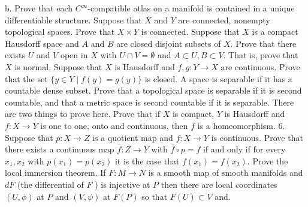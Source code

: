 \documentclass[10pt]{article}
\begin{document}
b. Prove that each $C^{\infty}$-compatible atlas on a manifold is contained in a unique differentiable structure.
\newpage
   Suppose that $X$ and $Y$ are connected, nonempty topological spaces. Prove that $X \times Y$ is connected.
\newpage
   Suppose that $X$ is a compact Hausdorff space and $A$ and $B$ are closed disjoint subsets of $X$. Prove that there exists $U$ and $V$ open in $X$ with $U \cap V=\emptyset$ and $A \subset U, B \subset V$. That is, prove that $X$ is normal.
\newpage
   Suppose that $X$ is Hausdorff and $f, g: Y \rightarrow X$ are continuous. Prove that the set $\{y \in Y \mid f(y)=g(y)\}$ is closed.
\newpage
   A space is separable if it has a countable dense subset. Prove that a topological space is separable if it is second countable, and that a metric space is second countable if it is separable. There are two things to prove here.
\newpage
   Prove that if $X$ is compact, $Y$ is Hausdorff and $f: X \rightarrow Y$ is one to one, onto and continuous, then $f$ is a homeomorphism. 6. Suppose that $p: X \rightarrow Z$ is a quotient map and $f: X \rightarrow Y$ is continuous. Prove that there exists a continuous map $\bar{f}: Z \rightarrow Y$ with $\bar{f} \circ p=f$ if and only if for every $x_{1}, x_{2}$ with $p\left(x_{1}\right)=p\left(x_{2}\right)$ it is the case that $f\left(x_{1}\right)=f\left(x_{2}\right)$.
\newpage
 Prove the local immersion theorem. If $F: M \rightarrow N$ is a smooth map of smooth manifolds and $d F$ (the differential of $F$ ) is injective at $P$ then there are local coordinates $(U, \phi)$ at $P$ and $(V, \psi)$ at $F(P)$ so that $F(U) \subset V$ and.
\end{document}
